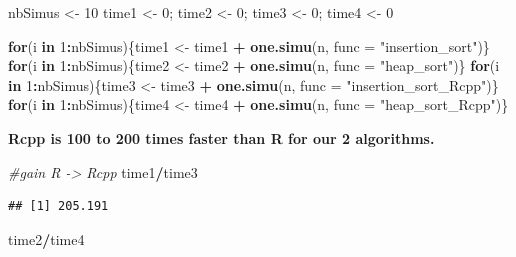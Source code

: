 \documentclass[
]{article}
\newenvironment{Shaded}{\begin{snugshade}}{\end{snugshade}}
\newcommand{\AttributeTok}[1]{\textcolor[rgb]{0.13,0.29,0.53}{#1}}
\newcommand{\CommentTok}[1]{\textcolor[rgb]{0.56,0.35,0.01}{\textit{#1}}}
\newcommand{\ControlFlowTok}[1]{\textcolor[rgb]{0.13,0.29,0.53}{\textbf{#1}}}
\newcommand{\DecValTok}[1]{\textcolor[rgb]{0.00,0.00,0.81}{#1}}
\newcommand{\FunctionTok}[1]{\textcolor[rgb]{0.13,0.29,0.53}{\textbf{#1}}}
\newcommand{\NormalTok}[1]{#1}
\newcommand{\OtherTok}[1]{\textcolor[rgb]{0.56,0.35,0.01}{#1}}
\newcommand{\SpecialCharTok}[1]{\textcolor[rgb]{0.81,0.36,0.00}{\textbf{#1}}}
\newcommand{\StringTok}[1]{\textcolor[rgb]{0.31,0.60,0.02}{#1}}
\begin{document}
\begin{Shaded}
\begin{Highlighting}[]
\NormalTok{nbSimus }\OtherTok{\textless{}{-}} \DecValTok{10}
\NormalTok{time1 }\OtherTok{\textless{}{-}} \DecValTok{0}\NormalTok{; time2 }\OtherTok{\textless{}{-}} \DecValTok{0}\NormalTok{; time3 }\OtherTok{\textless{}{-}} \DecValTok{0}\NormalTok{; time4 }\OtherTok{\textless{}{-}} \DecValTok{0}

\ControlFlowTok{for}\NormalTok{(i }\ControlFlowTok{in} \DecValTok{1}\SpecialCharTok{:}\NormalTok{nbSimus)\{time1 }\OtherTok{\textless{}{-}}\NormalTok{ time1 }\SpecialCharTok{+} \FunctionTok{one.simu}\NormalTok{(n, }\AttributeTok{func =} \StringTok{"insertion\_sort"}\NormalTok{)\}}
\ControlFlowTok{for}\NormalTok{(i }\ControlFlowTok{in} \DecValTok{1}\SpecialCharTok{:}\NormalTok{nbSimus)\{time2 }\OtherTok{\textless{}{-}}\NormalTok{ time2 }\SpecialCharTok{+} \FunctionTok{one.simu}\NormalTok{(n, }\AttributeTok{func =} \StringTok{"heap\_sort"}\NormalTok{)\}}
\ControlFlowTok{for}\NormalTok{(i }\ControlFlowTok{in} \DecValTok{1}\SpecialCharTok{:}\NormalTok{nbSimus)\{time3 }\OtherTok{\textless{}{-}}\NormalTok{ time3 }\SpecialCharTok{+} \FunctionTok{one.simu}\NormalTok{(n, }\AttributeTok{func =} \StringTok{"insertion\_sort\_Rcpp"}\NormalTok{)\}}
\ControlFlowTok{for}\NormalTok{(i }\ControlFlowTok{in} \DecValTok{1}\SpecialCharTok{:}\NormalTok{nbSimus)\{time4 }\OtherTok{\textless{}{-}}\NormalTok{ time4 }\SpecialCharTok{+} \FunctionTok{one.simu}\NormalTok{(n, }\AttributeTok{func =} \StringTok{"heap\_sort\_Rcpp"}\NormalTok{)\}}
\end{Highlighting}
\end{Shaded}

\textbf{Rcpp is 100 to 200 times faster than R for our 2 algorithms.}

\begin{Shaded}
\begin{Highlighting}[]
\CommentTok{\#gain R {-}\textgreater{} Rcpp}
\NormalTok{time1}\SpecialCharTok{/}\NormalTok{time3}
\end{Highlighting}
\end{Shaded}

\begin{verbatim}
## [1] 205.191
\end{verbatim}

\begin{Shaded}
\begin{Highlighting}[]
\NormalTok{time2}\SpecialCharTok{/}\NormalTok{time4}
\end{Highlighting}
\end{Shaded}
\end{document}
